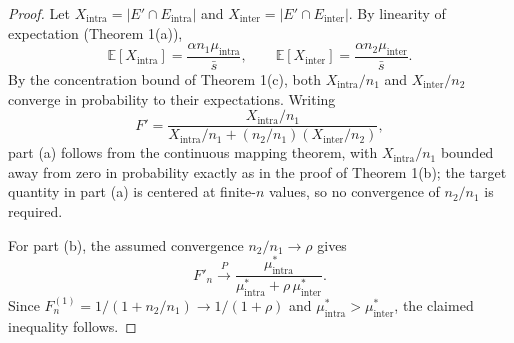 \documentclass[10pt,journal,compsoc]{IEEEtran}
\begin{document}
\begin{proof}
Let $X_{\text{intra}} = |E' \cap E_{\text{intra}}|$ and $X_{\text{inter}} = |E' \cap E_{\text{inter}}|$.
By linearity of expectation (Theorem 1(a)),
\begin{equation}
\mathbb{E}[X_{\text{intra}}] = \frac{\alpha n_1 \mu_{\text{intra}}}{\bar{s}}, \qquad
\mathbb{E}[X_{\text{inter}}] = \frac{\alpha n_2 \mu_{\text{inter}}}{\bar{s}}.
\end{equation}
By the concentration bound of Theorem 1(c), both $X_{\text{intra}}/n_1$ and $X_{\text{inter}}/n_2$ converge in probability to their expectations.
Writing
\begin{equation}
F' = \frac{X_{\text{intra}}/n_1}{X_{\text{intra}}/n_1 + (n_2/n_1)(X_{\text{inter}}/n_2)},
\end{equation}
part (a) follows from the continuous mapping theorem, with $X_{\text{intra}}/n_1$ bounded away from zero in probability exactly as in the proof of Theorem 1(b); the target quantity in part (a) is centered at finite-$n$ values, so no convergence of $n_2/n_1$ is required.

For part (b), the assumed convergence $n_2/n_1 \to \rho$ gives
\begin{equation}
F'_n \xrightarrow{P} \frac{\mu_{\text{intra}}^*}{\mu_{\text{intra}}^* + \rho\, \mu_{\text{inter}}^*}.
\end{equation}
Since $F^{(1)}_n = 1/(1 + n_2/n_1) \to 1/(1+\rho)$ and $\mu_{\text{intra}}^* > \mu_{\text{inter}}^*$, the claimed inequality follows.
\end{proof}
\end{document}
